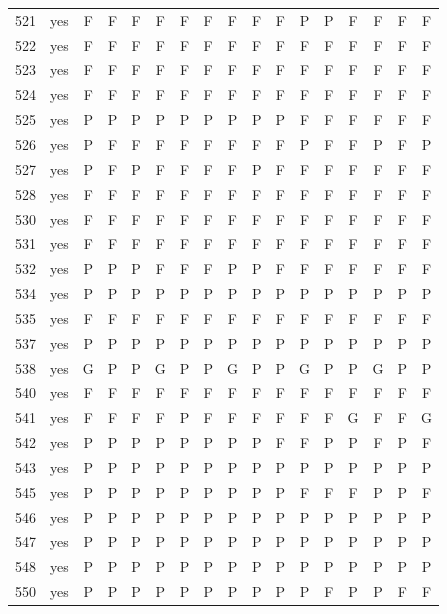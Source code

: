 \begin{table}[p]
\begin{tabular*}{\textwidth}{@{\extracolsep{\fill}}rcccccccccccccccc}
521 & yes & F & F & F & F & F & F & F & F & F & P & P & F & F & F & F\\
522 & yes & F & F & F & F & F & F & F & F & F & F & F & F & F & F & F\\
523 & yes & F & F & F & F & F & F & F & F & F & F & F & F & F & F & F\\
524 & yes & F & F & F & F & F & F & F & F & F & F & F & F & F & F & F\\
525 & yes & P & P & P & P & P & P & P & P & P & F & F & F & F & F & F\\
526 & yes & P & F & F & F & F & F & F & F & F & P & F & F & P & F & P\\
527 & yes & P & F & P & F & F & F & F & P & F & F & F & F & F & F & F\\
528 & yes & F & F & F & F & F & F & F & F & F & F & F & F & F & F & F\\
530 & yes & F & F & F & F & F & F & F & F & F & F & F & F & F & F & F\\
531 & yes & F & F & F & F & F & F & F & F & F & F & F & F & F & F & F\\
532 & yes & P & P & P & F & F & F & P & P & F & F & F & F & F & F & F\\
534 & yes & P & P & P & P & P & P & P & P & P & P & P & P & P & P & P\\
535 & yes & F & F & F & F & F & F & F & F & F & F & F & F & F & F & F\\
537 & yes & P & P & P & P & P & P & P & P & P & P & P & P & P & P & P\\
538 & yes & G & P & P & G & P & P & G & P & P & G & P & P & G & P & P\\
540 & yes & F & F & F & F & F & F & F & F & F & F & F & F & F & F & F\\
541 & yes & F & F & F & F & P & F & F & F & F & F & F & G & F & F & G\\
542 & yes & P & P & P & P & P & P & P & P & F & F & P & P & F & P & F\\
543 & yes & P & P & P & P & P & P & P & P & P & P & P & P & P & P & P\\
545 & yes & P & P & P & P & P & P & P & P & P & F & F & F & P & P & F\\
546 & yes & P & P & P & P & P & P & P & P & P & P & P & P & P & P & P\\
547 & yes & P & P & P & P & P & P & P & P & P & P & P & P & P & P & P\\
548 & yes & P & P & P & P & P & P & P & P & P & P & P & P & P & P & P\\
550 & yes & P & P & P & P & P & P & P & P & P & P & F & P & P & F & F\\
\bottomrule\end{tabular*}\end{table}
\clearpage

